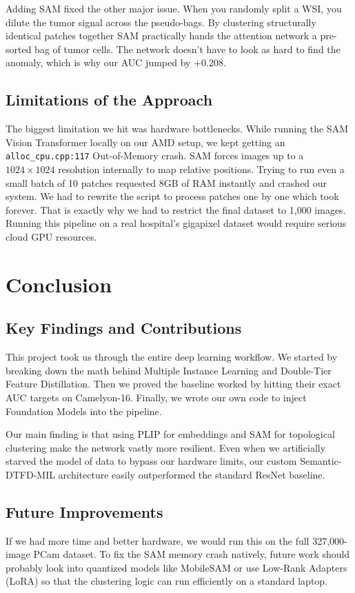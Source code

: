 \documentclass[12pt, a4paper]{article}
\begin{document}
Adding SAM fixed the other major issue. When you randomly split a WSI, you dilute the tumor signal across the pseudo-bags. By clustering structurally identical patches together SAM practically hands the attention network a pre-sorted bag of tumor cells. The network doesn't have to look as hard to find the anomaly, which is why our AUC jumped by +0.208.

\subsection{Limitations of the Approach}
The biggest limitation we hit was hardware bottlenecks. While running the SAM Vision Transformer locally on our AMD setup, we kept getting an \texttt{alloc\_cpu.cpp:117} Out-of-Memory crash. SAM forces images up to a $1024 \times 1024$ resolution internally to map relative positions. Trying to run even a small batch of 10 patches requested 8GB of RAM instantly and crashed our system. We had to rewrite the script to process patches one by one which took forever. That is exactly why we had to restrict the final dataset to 1,000 images. Running this pipeline on a real hospital's gigapixel dataset would require serious cloud GPU resources.

\section{Conclusion}
\subsection{Key Findings and Contributions}
This project took us through the entire deep learning workflow. We started by breaking down the math behind Multiple Instance Learning and Double-Tier Feature Distillation. Then we proved the baseline worked by hitting their exact AUC targets on Camelyon-16. Finally, we wrote our own code to inject Foundation Models into the pipeline. 

Our main finding is that using PLIP for embeddings and SAM for topological clustering make the network vastly more resilient. Even when we artificially starved the model of data to bypass our hardware limits, our custom Semantic-DTFD-MIL architecture easily outperformed the standard ResNet baseline.

\subsection{Future Improvements}
If we had more time and better hardware, we would run this on the full 327,000-image PCam dataset. To fix the SAM memory crash natively, future work should probably look into quantized models like MobileSAM or use Low-Rank Adapters (LoRA) so that the clustering logic can run efficiently on a standard laptop.
\end{document}

